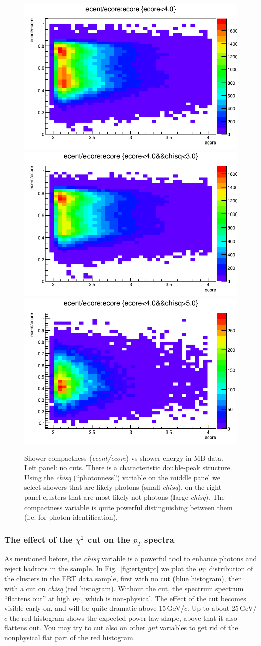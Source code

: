 \documentclass[pdftex,12pt,letter]{article}
\newcommand{\pt}{\mbox{$p_{\rm T}$}\xspace}
\newcommand{\gevc}{\mbox{GeV/$c$}\xspace}
\begin{document}
\begin{center}
\begin{figure}[htbp]
  \includegraphics[width=0.3\linewidth]{figs/mbcentcore_nocut.png}
  \includegraphics[width=0.3\linewidth]{figs/mbcentcore_chilt3.png}
  \includegraphics[width=0.3\linewidth]{figs/mbcentcore_chigt5.png}
  \caption{Shower compactness ({\it ecent/ecore}) vs shower energy in
    MB data.  Left panel: no cuts.  There is a characteristic
    double-peak structure.  Using the {\it chisq} (``photonness'')
    variable on the middle panel we select showers that are likely
    photons (small {\it chisq}), 
    on the right panel clusters that are most likely not
    photons (large {\it chisq}).  The compactness variable is quite powerful
    distinguishing between them (i.e. for photon identification).
  }
    \label{fig:ecentecore}
\end{figure}
\end{center}

\subsubsection{The effect of the $\chi^2$ cut on the $p_T$ spectra}
As mentioned before, the {\it chisq} variable is a powerful tool to
enhance photons and reject hadrons in the sample.  In 
Fig.~\ref{fig:ertgntpt} we plot the \pt distribution of the clusters
in the ERT data sample, first with no cut (blue histogram), then with
a cut on {\it chisq} (red histogram).  Without the cut, the spectrum
spectrum ``flattens out'' at high \pt, which is non-physical.  The
effect of the cut becomes visible early on, and will be quite dramatic
above 15\,\gevc.  Up to about 25\,\gevc the red histogram shows the
expected power-law shape, above that it also flattens out.  You may
try to cut also on other {\it gnt} variables to get rid of the
nonphysical flat part of the red histogram.
\end{document}
